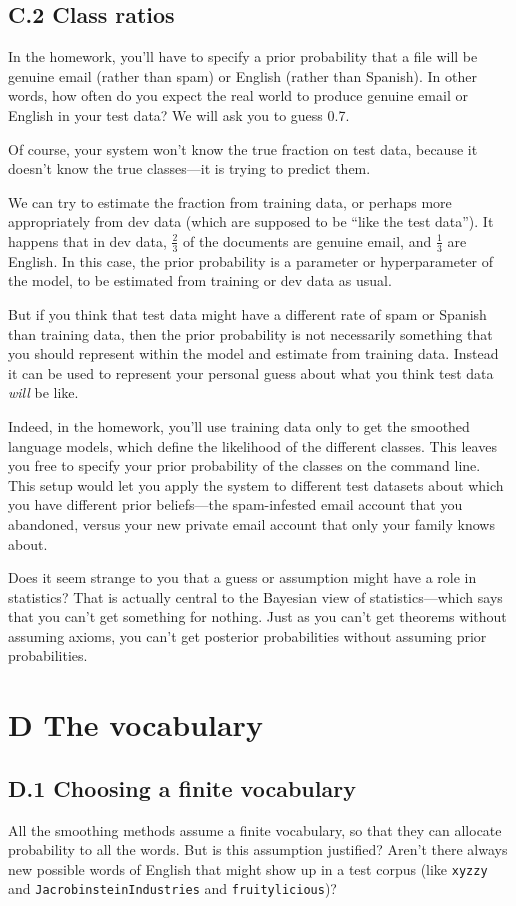 \subsection*{C.2 Class ratios}
In the homework, you’ll have to specify a prior probability that a file will be genuine email (rather than spam) or English (rather than Spanish). In other words, how often do you expect the real world to produce genuine email or English in your test data? We will ask you to guess 0.7.

Of course, your system won’t know the true fraction on test data, because it doesn’t know the true classes—it is trying to predict them.

We can try to estimate the fraction from training data, or perhaps more appropriately from dev data (which are supposed to be “like the test data”). It happens that in dev data, $\tfrac{2}{3}$ of the documents are genuine email, and $\tfrac{1}{3}$ are English. In this case, the prior probability is a parameter or hyperparameter of the model, to be estimated from training or dev data as usual.

But if you think that test data might have a different rate of spam or Spanish than training data, then the prior probability is not necessarily something that you should represent within the model and estimate from training data. Instead it can be used to represent your personal guess about what you think test data \textit{will} be like.

Indeed, in the homework, you’ll use training data only to get the smoothed language models, which define the likelihood of the different classes. This leaves you free to specify your prior probability of the classes on the command line. This setup would let you apply the system to different test datasets about which you have different prior beliefs—the spam-infested email account that you abandoned, versus your new private email account that only your family knows about.

Does it seem strange to you that a guess or assumption might have a role in statistics? That is actually central to the Bayesian view of statistics—which says that you can’t get something for nothing. Just as you can’t get theorems without assuming axioms, you can’t get posterior probabilities without assuming prior probabilities.

\section*{D The vocabulary}
\subsection*{D.1 Choosing a finite vocabulary}
All the smoothing methods assume a finite vocabulary, so that they can allocate probability to all the words. But is this assumption justified? Aren’t there always new possible words of English that might show up in a test corpus (like \texttt{xyzzy} and \texttt{JacrobinsteinIndustries} and \texttt{fruitylicious})?

